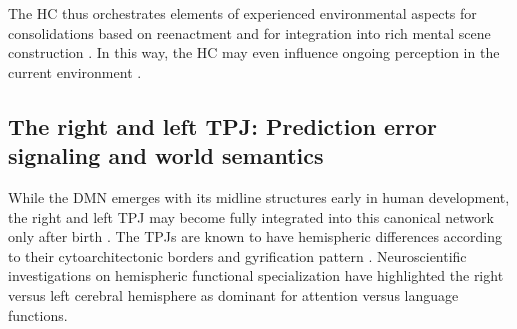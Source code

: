 \documentclass[10pt,letterpaper]{article}
\begin{document}
The HC thus orchestrates elements of experienced environmental aspects for
consolidations based on reenactment and for integration into
rich mental scene construction \citep{deuker2016event, bird2010establishing}.
In this way, the HC may even influence
ongoing perception in the current environment
\citep{maguire2016}.


\subsection{The right and left TPJ: Prediction error signaling and world semantics}
While the DMN emerges with its midline structures early in human development,
the right and left TPJ may become fully integrated into this canonical
network only after birth \citep{doria2010}.
The TPJs are known to have hemispheric differences
according to their cytoarchitectonic borders and gyrification pattern
\citep{seghier2013angular}.
Neuroscientific investigations on hemispheric functional specialization
have highlighted the right versus left cerebral hemisphere as dominant for
attention versus language functions.
\end{document}
